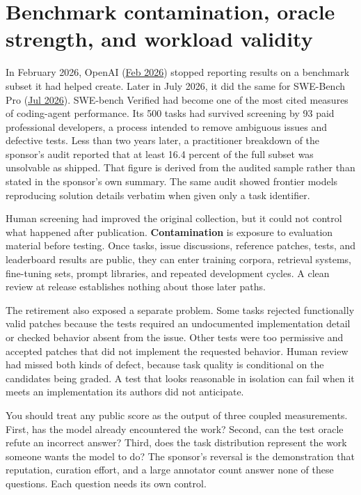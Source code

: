 \chapter{Benchmark contamination, oracle strength, and workload validity}
\label{ch03-contamination-oracle-workload-validity}
In February 2026, OpenAI (\href{https://openai.com/index/why-we-no-longer-evaluate-swe-bench-verified}{Feb 2026}) stopped reporting results on a benchmark subset it had helped create. Later in July 2026, it did the same for SWE-Bench Pro (\href{https://openai.com/index/separating-signal-from-noise-coding-evaluations/}{Jul 2026}). SWE-bench Verified had become one of the most cited measures of coding-agent performance. Its 500 tasks had survived screening by 93 paid professional developers, a process intended to remove ambiguous issues and defective tests. Less than two years later, a practitioner breakdown of the sponsor's audit reported that at least 16.4 percent of the full subset was unsolvable as shipped. That figure is derived from the audited sample rather than stated in the sponsor's own summary. The same audit showed frontier models reproducing solution details verbatim when given only a task identifier.

Human screening had improved the original collection, but it could not control what happened after publication. \textbf{Contamination} is exposure to evaluation material before testing. Once tasks, issue discussions, reference patches, tests, and leaderboard results are public, they can enter training corpora, retrieval systems, fine-tuning sets, prompt libraries, and repeated development cycles. A clean review at release establishes nothing about those later paths.

The retirement also exposed a separate problem. Some tasks rejected functionally valid patches because the tests required an undocumented implementation detail or checked behavior absent from the issue. Other tests were too permissive and accepted patches that did not implement the requested behavior. Human review had missed both kinds of defect, because task quality is conditional on the candidates being graded. A test that looks reasonable in isolation can fail when it meets an implementation its authors did not anticipate.

You should treat any public score as the output of three coupled measurements. First, has the model already encountered the work? Second, can the test oracle refute an incorrect answer? Third, does the task distribution represent the work someone wants the model to do? The sponsor's reversal is the demonstration that reputation, curation effort, and a large annotator count answer none of these questions. Each question needs its own control.

